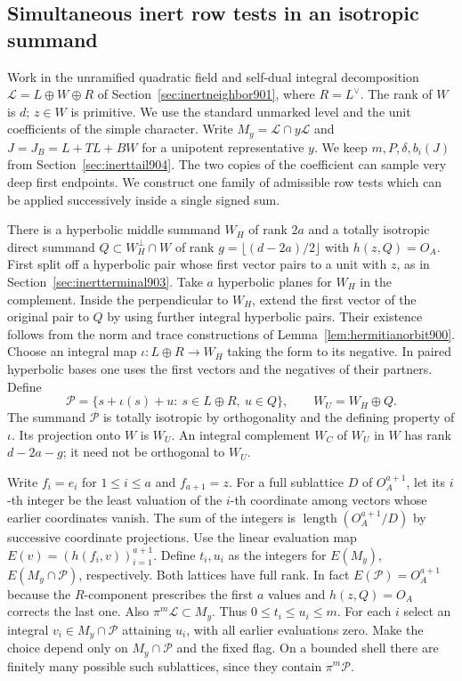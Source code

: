 \documentclass[a4paper,11pt]{article}
\theoremstyle{definition}
\theoremstyle{remark}
\numberwithin{equation}{section}
\begin{document}
\subsection{Simultaneous inert row tests in an isotropic summand}
\label{sec:inertjoint907}

Work in the unramified quadratic field and self-dual integral
decomposition \(\mathcal L=L\oplus W\oplus R\) of
Section~\ref{sec:inertneighbor901}, where \(R=L^\vee\).
The rank of \(W\) is \(d\); \(z\in W\) is primitive.
We use the standard unmarked level and the unit coefficients
of the simple character. Write \(M_y=\mathcal L\cap y\mathcal L\)
and \(J=J_B=L+TL+BW\) for a unipotent representative \(y\).
We keep \(m,P,\delta,b_i(J)\) from Section~\ref{sec:inerttail904}.
The two copies of the coefficient can sample very deep first
endpoints. We construct one family of admissible row tests
which can be applied successively inside a single signed sum.

There is a hyperbolic middle summand \(W_H\) of rank \(2a\)
and a totally isotropic direct summand \(Q\subset W_H^\perp\cap W\)
of rank \(g=\lfloor(d-2a)/2\rfloor\) with \(h(z,Q)=O_A\).
First split off a hyperbolic pair whose first vector pairs to
a unit with \(z\), as in Section~\ref{sec:inertterminal903}.
Take \(a\) hyperbolic planes for \(W_H\) in the complement.
Inside the perpendicular to \(W_H\), extend the first vector
of the original pair to \(Q\) by using further integral
hyperbolic pairs. Their existence follows from the norm and
trace constructions of Lemma~\ref{lem:hermitianorbit900}.
Choose an integral map \(\iota:L\oplus R\longrightarrow W_H\)
taking the form to its negative. In paired hyperbolic bases
one uses the first vectors and the negatives of their partners.
Define
\[
  \mathcal P=\{ s+\iota(s)+u:\ s\in L\oplus R,\ u\in Q\},
       \qquad W_U=W_H\oplus Q .
\]
The summand \(\mathcal P\) is totally isotropic by orthogonality
and the defining property of \(\iota\). Its projection onto \(W\)
is \(W_U\). An integral complement \(W_C\) of \(W_U\) in \(W\)
has rank \(d-2a-g\); it need not be orthogonal to \(W_U\).

Write \(f_i=e_i\) for \(1\le i\le a\) and \(f_{a+1}=z\).
For a full sublattice \(D\) of \(O_A^{a+1}\), let its \(i\)-th
integer be the least valuation of the \(i\)-th coordinate among
vectors whose earlier coordinates vanish. The sum of the integers
is \(\operatorname{length}(O_A^{a+1}/D)\) by successive coordinate
projections. Use the linear evaluation map
\(E(v)=(h(f_i,v))_{i=1}^{a+1}\). Define \(t_i,u_i\) as the
integers for \(E(M_y)\), \(E(M_y\cap\mathcal P)\), respectively.
Both lattices have full rank. In fact \(E(\mathcal P)=O_A^{a+1}\)
because the \(R\)-component prescribes the first \(a\) values
and \(h(z,Q)=O_A\) corrects the last one. Also
\(\pi^m\mathcal L\subset M_y\). Thus \(0\le t_i\le u_i\le m\).
For each \(i\) select an integral \(v_i\in M_y\cap\mathcal P\)
attaining \(u_i\), with all earlier evaluations zero. Make the
choice depend only on \(M_y\cap\mathcal P\) and the fixed flag.
On a bounded shell there are finitely many possible such
sublattices, since they contain \(\pi^m\mathcal P\).
\end{document}
